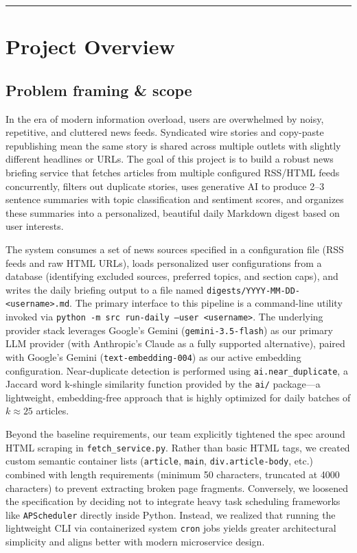 \documentclass[11pt,a4paper]{article}
\begin{document}
\tableofcontents
\vspace{0.6em}\hrule\vspace{0.4em}

\section{Project Overview}

\subsection{Problem framing \& scope}

In the era of modern information overload, users are overwhelmed by noisy, repetitive, and cluttered news feeds. Syndicated wire stories and copy-paste republishing mean the same story is shared across multiple outlets with slightly different headlines or URLs. The goal of this project is to build a robust news briefing service that fetches articles from multiple configured RSS/HTML feeds concurrently, filters out duplicate stories, uses generative AI to produce 2--3 sentence summaries with topic classification and sentiment scores, and organizes these summaries into a personalized, beautiful daily Markdown digest based on user interests.

The system consumes a set of news sources specified in a configuration file (RSS feeds and raw HTML URLs), loads personalized user configurations from a database (identifying excluded sources, preferred topics, and section caps), and writes the daily briefing output to a file named \texttt{digests/YYYY-MM-DD-<username>.md}. The primary interface to this pipeline is a command-line utility invoked via \texttt{python -m src run-daily --user <username>}. The underlying provider stack leverages Google's Gemini (\texttt{gemini-3.5-flash}) as our primary LLM provider (with Anthropic's Claude as a fully supported alternative), paired with Google's Gemini (\texttt{text-embedding-004}) as our active embedding configuration. Near-duplicate detection is performed using \texttt{ai.near\_duplicate}, a Jaccard word k-shingle similarity function provided by the \texttt{ai/} package—a lightweight, embedding-free approach that is highly optimized for daily batches of $k \approx 25$ articles.

Beyond the baseline requirements, our team explicitly tightened the spec around HTML scraping in \texttt{fetch\_service.py}. Rather than basic HTML tags, we created custom semantic container lists (\texttt{article}, \texttt{main}, \texttt{div.article-body}, etc.) combined with length requirements (minimum 50 characters, truncated at 4000 characters) to prevent extracting broken page fragments. Conversely, we loosened the specification by deciding not to integrate heavy task scheduling frameworks like \texttt{APScheduler} directly inside Python. Instead, we realized that running the lightweight CLI via containerized system \texttt{cron} jobs yields greater architectural simplicity and aligns better with modern microservice design.
\end{document}
